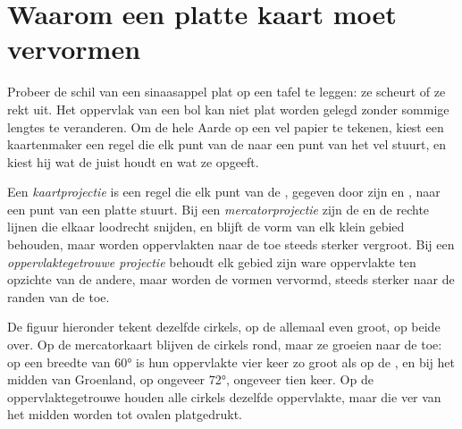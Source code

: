 \section{Waarom een platte kaart moet vervormen}

Probeer de schil van een sinaasappel plat op een tafel te leggen: ze
scheurt of ze rekt uit. Het oppervlak van een bol kan niet plat worden
gelegd zonder sommige lengtes te veranderen. Om de hele Aarde op een vel
papier te tekenen, kiest een kaartenmaker een regel die elk punt van de
 naar een punt van het vel stuurt, en kiest hij wat de  juist
houdt en wat ze opgeeft.

\begin{definition}[Kaartprojectie]\label{def:g9:maps-of-the-earth:projection}
Een \emph{kaartprojectie} is een regel die elk punt
van de , gegeven door zijn  en , naar een punt
van een platte  stuurt. Bij een
\emph{mercatorprojectie} zijn de  en
de  rechte lijnen die elkaar loodrecht snijden, en blijft de vorm
van elk klein gebied behouden, maar worden oppervlakten naar de  toe
steeds sterker vergroot. Bij een \emph{oppervlaktegetrouwe
projectie} behoudt elk gebied zijn
ware oppervlakte ten opzichte van de andere, maar worden de vormen
vervormd, steeds sterker naar de randen van de  toe.
\end{definition}

De figuur hieronder tekent dezelfde cirkels, op de  allemaal even
groot, op beide  over. Op de mercatorkaart blijven de cirkels rond,
maar ze groeien naar de  toe: op een breedte van \ang{60} is hun
oppervlakte vier keer zo groot als op de , en bij het midden van
Groenland, op ongeveer \ang{72}, ongeveer tien keer. Op de
oppervlaktegetrouwe  houden alle cirkels dezelfde oppervlakte, maar
die ver van het midden worden tot ovalen platgedrukt.

